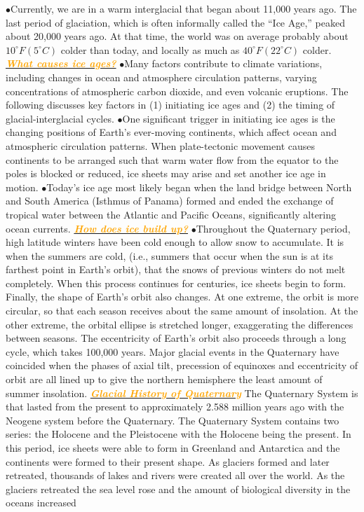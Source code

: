 \documentclass{article}
\newcommand{\ddd}{$\bullet$}
\newcommand{\orange}[1]{\textcolor{orange}{#1}}
\newcommand{\mysub}[1]{\underline{\textbf{{\textit{\orange{#1}}}}}}
\begin{document}
\begin{multicols*}{4}
                \ddd Currently, we are in a warm interglacial that began about 11,000 years ago. The last period of glaciation, which is often informally called the “Ice Age,” peaked about 20,000 years ago. At that time, the world was on average probably about $ 10^\circ F (5^\circ C) $ colder than today, and locally as much as $ 40^\circ F (22^\circ C) $ colder.
            \mysub{What causes ice ages?}
                \ddd Many factors contribute to climate variations, including changes in ocean and atmosphere circulation patterns, varying concentrations of atmospheric carbon dioxide, and even volcanic eruptions. The following discusses key factors in (1) initiating ice ages and (2) the timing of glacial-interglacial cycles.
                \ddd One significant trigger in initiating ice ages is the changing positions of Earth’s ever-moving continents, which affect ocean and atmospheric circulation patterns. When plate-tectonic movement causes continents to be arranged such that warm water flow from the equator to the poles is blocked or reduced, ice sheets may arise and set another ice age in motion.
                \ddd Today’s ice age most likely began when the land bridge between North and South America (Isthmus of Panama) formed and ended the exchange of tropical water between the Atlantic and Pacific Oceans, significantly altering ocean currents.
            \mysub{How does ice build up?}
                \ddd Throughout the Quaternary period, high latitude winters have been cold enough to allow snow to accumulate. It is when the summers are cold, (i.e., summers that occur when the sun is at its farthest point in Earth's orbit), that the snows of previous winters do not melt completely. When this process continues for centuries, ice sheets begin to form. Finally, the shape of Earth's orbit also changes. At one extreme, the orbit is more circular, so that each season receives about the same amount of insolation. At the other extreme, the orbital ellipse is stretched longer, exaggerating the differences between seasons. The eccentricity of Earth's orbit also proceeds through a long cycle, which takes 100,000 years. Major glacial events in the Quaternary have coincided when the phases of axial tilt, precession of equinoxes and eccentricity of orbit are all lined up to give the northern hemisphere the least amount of summer insolation.
            \mysub{Glacial History of Quaternary}
                The Quaternary System is that lasted from the present to approximately 2.588 million years ago with the Neogene system before the Quaternary. The Quaternary System contains two series: the Holocene and the Pleistocene with the Holocene being the present. In this period, ice sheets were able to form in Greenland and Antarctica and the continents were formed to their present shape. As glaciers formed and later retreated, thousands of lakes and rivers were created all over the world. As the glaciers retreated the sea level rose and the amount of biological diversity in the oceans increased

\end{multicols*}
\end{document}
